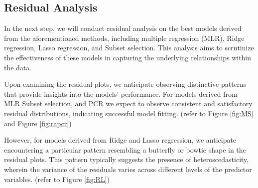 \documentclass[12pt,doublespace]{article}
\begin{document}
		\subsection{Residual Analysis}
	
	In the next step, we will conduct residual analysis on the best models derived from the aforementioned methods, including multiple regression (MLR), Ridge regression, Lasso regression, and Subset selection. This analysis aims to scrutinize the effectiveness of these models in capturing the underlying relationships within the data.
	
	Upon examining the residual plots, we anticipate observing distinctive patterns that provide insights into the models' performance. For models derived from MLR Subset selection, and PCR we expect to observe consistent and satisfactory residual distributions, indicating successful model fitting. (refer to Figure \ref{fig:MS} and Figure \ref{fig:rapcr})
	
	However, for models derived from Ridge and Lasso regression, we anticipate encountering a particular pattern resembling a butterfly or bowtie shape in the residual plots. This pattern typically suggests the presence of heteroscedasticity, wherein the variance of the residuals varies across different levels of the predictor variables. (refer to Figure \ref{fig:RL})
	
\end{document}
